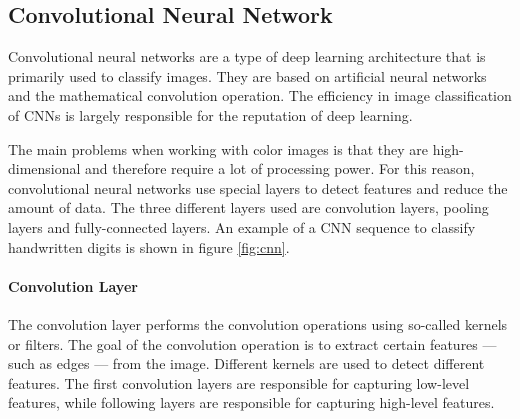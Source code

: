 \subsection{Convolutional Neural Network}
\label{subsec:cnn}

Convolutional neural networks are a type of deep learning architecture that is primarily used to classify images.
They are based on artificial neural networks and the mathematical convolution operation.
The efficiency in image classification of CNNs is largely responsible for the reputation of deep learning.

The main problems when working with color images is that they are high-dimensional and therefore require a lot of processing power.
For this reason, convolutional neural networks use special layers to detect features and reduce the amount of data.
The three different layers used are convolution layers, pooling layers and fully-connected layers.
An example of a CNN sequence to classify handwritten digits is shown in figure \ref{fig:cnn}.

\paragraph{Convolution Layer}
The convolution layer performs the convolution operations using so-called kernels or filters.
The goal of the convolution operation is to extract certain features --- such as edges --- from the image.
Different kernels are used to detect different features.
The first convolution layers are responsible for capturing low-level features, while following layers are responsible for capturing high-level features.
\clearpage

